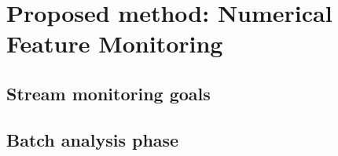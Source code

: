 \section{Proposed method: Numerical Feature Monitoring}



\subsection{Stream monitoring goals}

\subsection{Batch analysis phase}

